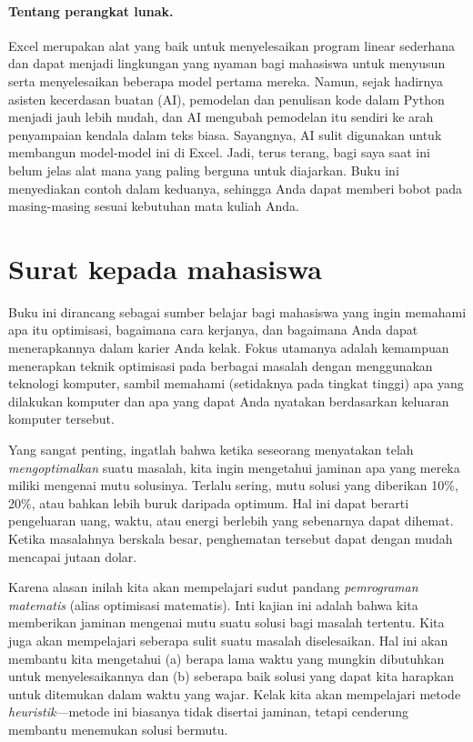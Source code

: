 \paragraph{Tentang perangkat lunak.}
Excel merupakan alat yang baik untuk menyelesaikan program linear sederhana dan dapat menjadi lingkungan yang nyaman bagi mahasiswa untuk menyusun serta menyelesaikan beberapa model pertama mereka.  Namun, sejak hadirnya asisten kecerdasan buatan (AI), pemodelan dan penulisan kode dalam Python menjadi jauh lebih mudah, dan AI mengubah pemodelan itu sendiri ke arah penyampaian kendala dalam teks biasa.  Sayangnya, AI sulit digunakan untuk membangun model-model ini di Excel.  Jadi, terus terang, bagi saya saat ini belum jelas alat mana yang paling berguna untuk diajarkan.  Buku ini menyediakan contoh dalam keduanya, sehingga Anda dapat memberi bobot pada masing-masing sesuai kebutuhan mata kuliah Anda.

\section*{Surat kepada mahasiswa}

Buku ini dirancang sebagai sumber belajar bagi mahasiswa yang ingin memahami apa itu optimisasi, bagaimana cara kerjanya, dan bagaimana Anda dapat menerapkannya dalam karier Anda kelak.  Fokus utamanya adalah kemampuan menerapkan teknik optimisasi pada berbagai masalah dengan menggunakan teknologi komputer, sambil memahami (setidaknya pada tingkat tinggi) apa yang dilakukan komputer dan apa yang dapat Anda nyatakan berdasarkan keluaran komputer tersebut.

Yang sangat penting, ingatlah bahwa ketika seseorang menyatakan telah \emph{mengoptimalkan} suatu masalah, kita ingin mengetahui jaminan apa yang mereka miliki mengenai mutu solusinya.  Terlalu sering, mutu solusi yang diberikan 10\%, 20\%, atau bahkan lebih buruk daripada optimum.  Hal ini dapat berarti pengeluaran uang, waktu, atau energi berlebih yang sebenarnya dapat dihemat. Ketika masalahnya berskala besar, penghematan tersebut dapat dengan mudah mencapai jutaan dolar.

Karena alasan inilah kita akan mempelajari sudut pandang \emph{pemrograman matematis} (alias optimisasi matematis).  Inti kajian ini adalah bahwa kita memberikan jaminan mengenai mutu suatu solusi bagi masalah tertentu.  Kita juga akan mempelajari seberapa sulit suatu masalah diselesaikan.  Hal ini akan membantu kita mengetahui (a) berapa lama waktu yang mungkin dibutuhkan untuk menyelesaikannya dan (b) seberapa baik solusi yang dapat kita harapkan untuk ditemukan dalam waktu yang wajar. Kelak kita akan mempelajari metode \emph{heuristik}---metode ini biasanya tidak disertai jaminan, tetapi cenderung membantu menemukan solusi bermutu.

